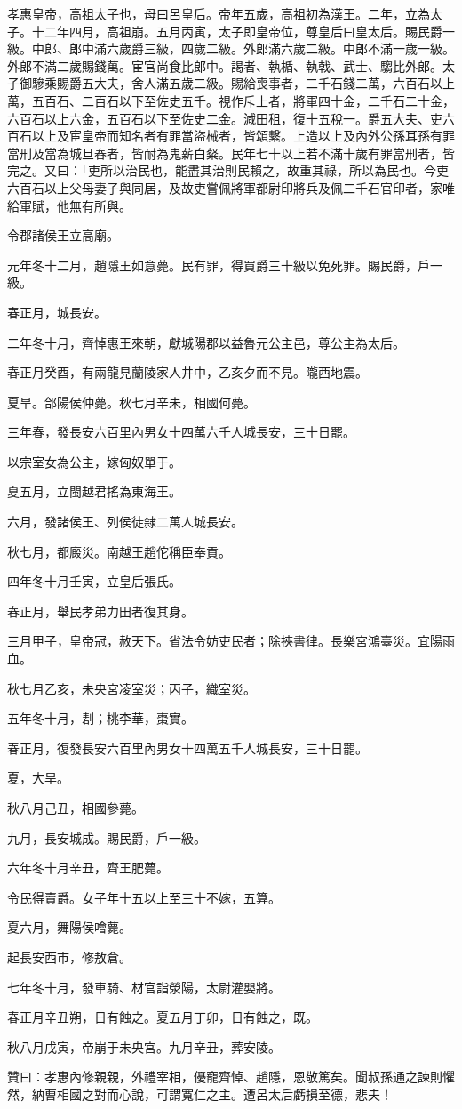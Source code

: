 
\begin{pinyinscope}
孝惠皇帝，高祖太子也，母曰呂皇后。帝年五歲，高祖初為漢王。二年，立為太子。十二年四月，高祖崩。五月丙寅，太子即皇帝位，尊皇后曰皇太后。賜民爵一級。中郎、郎中滿六歲爵三級，四歲二級。外郎滿六歲二級。中郎不滿一歲一級。外郎不滿二歲賜錢萬。宦官尚食比郎中。謁者、執楯、執戟、武士、騶比外郎。太子御驂乘賜爵五大夫，舍人滿五歲二級。賜給喪事者，二千石錢二萬，六百石以上萬，五百石、二百石以下至佐史五千。視作斥上者，將軍四十金，二千石二十金，六百石以上六金，五百石以下至佐史二金。減田租，復十五稅一。爵五大夫、吏六百石以上及宦皇帝而知名者有罪當盜械者，皆頌繫。上造以上及內外公孫耳孫有罪當刑及當為城旦舂者，皆耐為鬼薪白粲。民年七十以上若不滿十歲有罪當刑者，皆完之。又曰：「吏所以治民也，能盡其治則民賴之，故重其祿，所以為民也。今吏六百石以上父母妻子與同居，及故吏嘗佩將軍都尉印將兵及佩二千石官印者，家唯給軍賦，他無有所與。

令郡諸侯王立高廟。

元年冬十二月，趙隱王如意薨。民有罪，得買爵三十級以免死罪。賜民爵，戶一級。

春正月，城長安。

二年冬十月，齊悼惠王來朝，獻城陽郡以益魯元公主邑，尊公主為太后。

春正月癸酉，有兩龍見蘭陵家人井中，乙亥夕而不見。隴西地震。

夏旱。郃陽侯仲薨。秋七月辛未，相國何薨。

三年春，發長安六百里內男女十四萬六千人城長安，三十日罷。

以宗室女為公主，嫁匈奴單于。

夏五月，立閩越君搖為東海王。

六月，發諸侯王、列侯徒隸二萬人城長安。

秋七月，都廄災。南越王趙佗稱臣奉貢。

四年冬十月壬寅，立皇后張氏。

春正月，舉民孝弟力田者復其身。

三月甲子，皇帝冠，赦天下。省法令妨吏民者；除挾書律。長樂宮鴻臺災。宜陽雨血。

秋七月乙亥，未央宮凌室災；丙子，織室災。

五年冬十月，剨；桃李華，棗實。

春正月，復發長安六百里內男女十四萬五千人城長安，三十日罷。

夏，大旱。

秋八月己丑，相國參薨。

九月，長安城成。賜民爵，戶一級。

六年冬十月辛丑，齊王肥薨。

令民得賣爵。女子年十五以上至三十不嫁，五算。

夏六月，舞陽侯噲薨。

起長安西巿，修敖倉。

七年冬十月，發車騎、材官詣滎陽，太尉灌嬰將。

春正月辛丑朔，日有蝕之。夏五月丁卯，日有蝕之，既。

秋八月戊寅，帝崩于未央宮。九月辛丑，葬安陵。

贊曰：孝惠內修親親，外禮宰相，優寵齊悼、趙隱，恩敬篤矣。聞叔孫通之諫則懼然，納曹相國之對而心說，可謂寬仁之主。遭呂太后虧損至德，悲夫！


\end{pinyinscope}